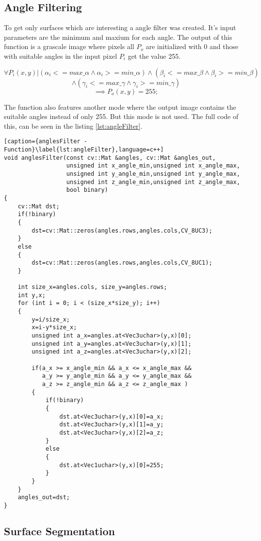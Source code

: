 \subsection{Angle Filtering}

To get only surfaces which are interesting a angle filter was created. It's input parameters
are the minimum and maxium for each angle. The output of this function is a grascale image
where pixels all $P_o$ are initialized with 0 and those with suitable angles 
in the input pixel $P_i$ get the value 255.

 \[
 	\forall P_i(x,y) | (\alpha_i<=max\_\alpha \wedge \alpha_i>=min\_\alpha) \wedge
 	(\beta_i<=max\_\beta \wedge \beta_i>=min\_\beta) \]\[ \wedge (\gamma_i<=max\_\gamma \wedge \gamma_i>=min\_\gamma)
 \]\[
 	\implies P_o(x,y) = 255;
 \] 

The function also features another mode where the output image contains the suitable angles instead of only 255.
But this mode is not used. The full code of this, can be seen in the listing \vref{lst:angleFilter}.

\begin{lstlisting}[caption={anglesFilter - Function}\label{lst:angleFilter},language=c++]
void anglesFilter(const cv::Mat &angles, cv::Mat &angles_out, 
                  unsigned int x_angle_min,unsigned int x_angle_max,
                  unsigned int y_angle_min,unsigned int y_angle_max,
                  unsigned int z_angle_min,unsigned int z_angle_max, 
                  bool binary)
{
	cv::Mat dst;
	if(!binary)
	{
		dst=cv::Mat::zeros(angles.rows,angles.cols,CV_8UC3);
	}
	else
	{
		dst=cv::Mat::zeros(angles.rows,angles.cols,CV_8UC1);
	}

	int size_x=angles.cols, size_y=angles.rows;
	int y,x;
	for (int i = 0; i < (size_x*size_y); i++)
	{
		y=i/size_x;
		x=i-y*size_x;
		unsigned int a_x=angles.at<Vec3uchar>(y,x)[0];
		unsigned int a_y=angles.at<Vec3uchar>(y,x)[1];
		unsigned int a_z=angles.at<Vec3uchar>(y,x)[2];

		if(a_x >= x_angle_min && a_x <= x_angle_max && 
	 	   a_y >= y_angle_min && a_y <= y_angle_max && 
	 	   a_z >= z_angle_min && a_z <= z_angle_max )
		{
			if(!binary)
			{
				dst.at<Vec3uchar>(y,x)[0]=a_x;
				dst.at<Vec3uchar>(y,x)[1]=a_y;
				dst.at<Vec3uchar>(y,x)[2]=a_z;
			}
			else
			{
				dst.at<Vec1uchar>(y,x)[0]=255;
			}
		}
	}
	angles_out=dst;
}
\end{lstlisting}



\subsection{Surface Segmentation}

